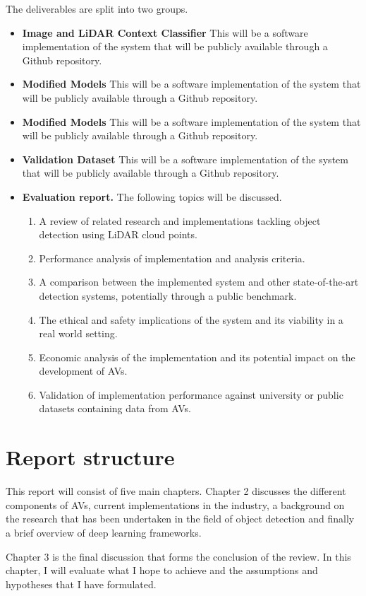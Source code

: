 The deliverables are split into two groups. 
\begin{itemize}
	 \item \textbf{Image and LiDAR Context Classifier} This will be a software implementation of the system that will be publicly available through a Github repository. 
	 \item \textbf{Modified Models} This will be a software implementation of the system that will be publicly available through a Github repository.
	 \item \textbf{Modified Models} This will be a software implementation of the system that will be publicly available through a Github repository.
	 \item \textbf{Validation Dataset} This will be a software implementation of the system that will be publicly available through a Github repository.
	  
	\item \textbf{Evaluation report.} The following topics will be discussed. 
	\begin{enumerate}
		\item A review of related research and implementations tackling object detection using LiDAR cloud points. 
		\item Performance analysis of implementation and analysis criteria.
		\item A comparison between the implemented system and other state-of-the-art detection systems, potentially through a public benchmark. 
		\item The ethical and safety implications of the system and its viability in a real world setting. 
		\item Economic analysis of the implementation and its potential impact on the development of AVs. 
		\item Validation of implementation performance against university or public datasets containing data from AVs. 
	\end{enumerate}
\end{itemize}

\section{Report structure}

This report will consist of five main chapters. 
Chapter 2 discusses the different components of AVs, current implementations in the industry, a background on the research that has been undertaken in the field of object detection and finally a brief overview of deep learning frameworks. 

Chapter 3 is the final discussion that forms the conclusion of the review. In this chapter, I will evaluate what I hope to achieve and the assumptions and hypotheses that I have formulated. 


